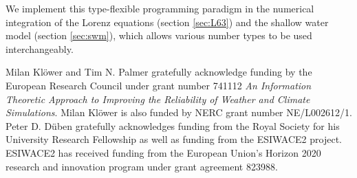 \documentclass[draft]{agujournal2019}
\begin{document}
We implement this type-flexible programming paradigm in the numerical integration of the Lorenz equations (section \ref{sec:L63}) and the shallow water model (section \ref{sec:swm}), which allows various number types to be used interchangeably.


\acknowledgments
Milan Kl\"{o}wer and Tim N. Palmer gratefully acknowledge funding by the European Research Council under grant number 741112 \emph{An Information Theoretic Approach to Improving the Reliability of Weather and Climate Simulations}. Milan Kl\"{o}wer is also funded by NERC grant number NE/L002612/1.  Peter D. D\"{u}ben gratefully acknowledges funding from the Royal Society for his University Research Fellowship as well as funding from the ESIWACE2 project. ESIWACE2 has received funding from the European Union's Horizon 2020 research and innovation program under grant agreement 823988.


\end{document}
